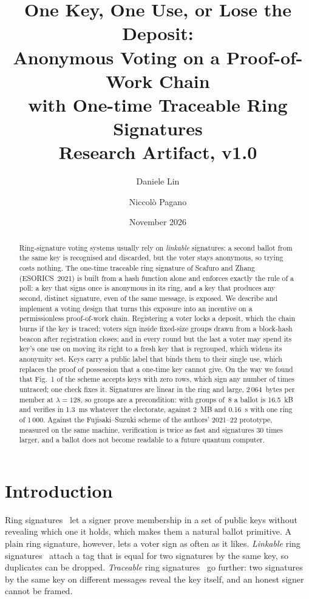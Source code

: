 \documentclass[11pt,a4paper]{article}
\title{\textbf{One Key, One Use, or Lose the Deposit:\\ Anonymous Voting on a Proof-of-Work Chain\\ with One-time Traceable Ring Signatures}\\[0.5em]
       \large Research Artifact, v1.0}
\author{Daniele Lin \and Niccol\`o Pagano}
\date{November 2026}
\theoremstyle{definition}
\begin{document}
\maketitle

\begin{abstract}
Ring-signature voting systems usually rely on \emph{linkable} signatures:
a second ballot from the same key is recognised and discarded, but the
voter stays anonymous, so trying costs nothing. The one-time traceable
ring signature of Scafuro and Zhang (ESORICS~2021) is built from a hash
function alone and enforces exactly the rule of a poll: a key that signs
once is anonymous in its ring, and a key that produces any second,
distinct signature, even of the same message, is exposed. We describe and
implement a voting design that turns this exposure into an incentive on a
permissionless proof-of-work chain. Registering a voter locks a deposit,
which the chain burns if the key is traced; voters sign inside
fixed-size groups drawn from a block-hash beacon after registration
closes; and in every round but the last a voter may spend its key's one
use on moving its right to a fresh key that is regrouped, which widens
its anonymity set. Keys carry a public label that binds them to their
single use, which replaces the proof of possession that a one-time key
cannot give. On the way we found that Fig.~1 of the scheme accepts keys
with zero rows, which sign any number of times untraced; one check fixes
it. Signatures are linear in the ring and large, $2\,064$~bytes per member
at $\lambda = 128$, so groups are a precondition: with groups of~8 a
ballot is 16.5~kB and verifies in 1.3~ms whatever the electorate, against
2~MB and 0.16~s with one ring of 1\,000. Against the Fujisaki--Suzuki
scheme of the authors' 2021--22 prototype, measured on the same machine,
verification is twice as fast and signatures 30 times larger, and a
ballot does not become readable to a future quantum computer.
\end{abstract}

\section{Introduction}

Ring signatures~\cite{RST01} let a signer prove membership in a set of
public keys without revealing which one it holds, which makes them a
natural ballot primitive. A plain ring signature, however, lets a voter
sign as often as it likes. \emph{Linkable} ring
signatures~\cite{LWW04,CLSAG2020} attach a tag that is equal for two
signatures by the same key, so duplicates can be dropped.
\emph{Traceable} ring signatures~\cite{FS07} go further: two signatures by
the same key on different messages reveal the key itself, and an honest
signer cannot be framed.
\end{document}
